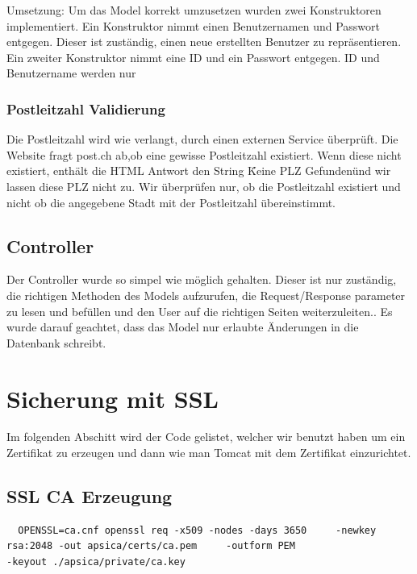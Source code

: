 \documentclass[10pt]{scrartcl}
\begin{document}
Umsetzung:
Um das Model korrekt umzusetzen wurden zwei Konstruktoren implementiert. Ein Konstruktor nimmt einen Benutzernamen und Passwort entgegen. Dieser ist zuständig, einen neue erstellten Benutzer zu repräsentieren. Ein zweiter Konstruktor nimmt eine ID und ein Passwort entgegen. ID und Benutzername werden nur 

\subsubsection{Postleitzahl Validierung}
Die Postleitzahl wird wie verlangt, durch einen externen Service überprüft. Die Website fragt post.ch ab,ob eine gewisse Postleitzahl existiert. Wenn diese nicht existiert, enthält die HTML Antwort den String \"Keine PLZ Gefunden\" und wir lassen diese PLZ nicht zu. Wir überprüfen nur, ob die Postleitzahl existiert und nicht ob die angegebene Stadt mit der Postleitzahl übereinstimmt. 

\subsection{Controller}
Der Controller wurde so simpel wie möglich gehalten. Dieser ist nur zuständig, die richtigen Methoden des Models aufzurufen, die Request/Response parameter zu lesen und befüllen und den User auf die richtigen Seiten weiterzuleiten.. Es wurde darauf geachtet, dass das Model nur erlaubte Änderungen in die Datenbank schreibt.


\section{Sicherung mit SSL}
Im folgenden Abschitt wird der Code gelistet, welcher wir benutzt haben um ein Zertifikat zu erzeugen und dann wie man Tomcat mit dem Zertifikat einzurichtet.

\subsection{SSL CA Erzeugung}
\begin{verbatim}
  OPENSSL=ca.cnf openssl req -x509 -nodes -days 3650     -newkey rsa:2048 -out apsica/certs/ca.pem     -outform PEM 
-keyout ./apsica/private/ca.key

\end{verbatim}
\end{document}
